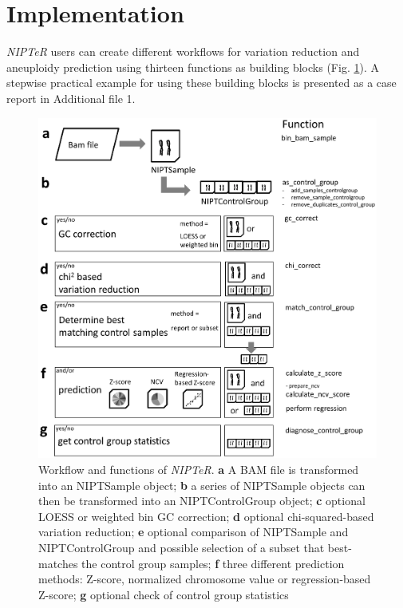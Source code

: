 \section{Implementation}\label{Implementation}
\textsl{NIPTeR} users can create different workflows for variation reduction and aneuploidy prediction using thirteen functions as building blocks (Fig. \ref{fig:NIPTeR_Fig1}).
A stepwise practical example for using these building blocks is presented as a case report in Additional file 1.

\begin{figure}
	\includegraphics[width=1.0\linewidth]{img/NIPTeR_Fig1}
	\caption[Workflow and functions of \textsl{NIPTeR}]{Workflow and functions of \textsl{NIPTeR}. \textbf{a} A BAM file is transformed into an NIPTSample object; \textbf{b} a series of NIPTSample objects can then be transformed into an NIPTControlGroup object; \textbf{c} optional LOESS or weighted bin GC correction; \textbf{d} optional chi-squared-based variation reduction; \textbf{e} optional comparison of NIPTSample and NIPTControlGroup and possible selection of a subset that best-matches the control group samples; \textbf{f} three different prediction methods: Z-score, normalized chromosome value or regression-based Z-score; \textbf{g} optional check of control group statistics}
	\label{fig:NIPTeR_Fig1}
\end{figure}


